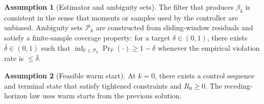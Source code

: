 \documentclass[journal]{IEEEtran}
\theoremstyle{definition}
\newtheorem{assumption}{Assumption}
\begin{document}
\begin{assumption}[Estimator and ambiguity sets]
\label{ass:estimator}
The filter that produces $\beta_k$ is consistent in the sense that moments or samples used by the
controller are unbiased. Ambiguity sets $\mathcal{P}_k$ are constructed from sliding-window
residuals and satisfy a finite-sample coverage property: for a target $\delta\in(0,1)$, there
exists $\bar{\delta}\in(0,1)$ such that
$\inf_{\mathbb{P}\in\mathcal{P}_k}\Pr_{\mathbb{P}}(\cdot)\ge 1-\delta$
whenever the empirical violation rate is $\le \bar{\delta}$.
\end{assumption}

\begin{assumption}[Feasible warm start]
\label{ass:warm}
At $k=0$, there exists a control sequence and terminal state that satisfy tightened constraints
and $R_0\ge 0$. The receding-horizon law uses warm starts from the previous solution.
\end{assumption}
\end{document}
